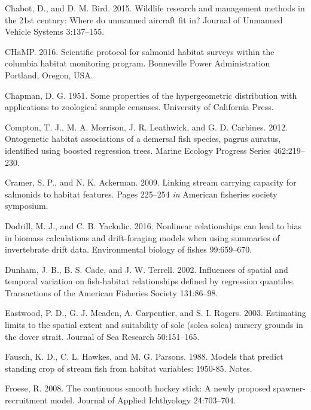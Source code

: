 \documentclass[
  12pt,
]{article}
\begin{document}
\leavevmode\hypertarget{ref-Chabot2015}{}%
Chabot, D., and D. M. Bird. 2015. Wildlife research and management methods in the 21st century: Where do unmanned aircraft fit in? Journal of Unmanned Vehicle Systems 3:137--155.

\leavevmode\hypertarget{ref-CHaMP2016}{}%
CHaMP. 2016. Scientific protocol for salmonid habitat surveys within the columbia habitat monitoring program. Bonneville Power Administration Portland, Oregon, USA.

\leavevmode\hypertarget{ref-Chapman1951}{}%
Chapman, D. G. 1951. Some properties of the hypergeometric distribution with applications to zoological sample censuses. University of California Press.

\leavevmode\hypertarget{ref-Compton2012}{}%
Compton, T. J., M. A. Morrison, J. R. Leathwick, and G. D. Carbines. 2012. Ontogenetic habitat associations of a demersal fish species, pagrus auratus, identified using boosted regression trees. Marine Ecology Progress Series 462:219--230.

\leavevmode\hypertarget{ref-Cramer2009}{}%
Cramer, S. P., and N. K. Ackerman. 2009. Linking stream carrying capacity for salmonids to habitat features. Pages 225--254 \emph{in} American fisheries society symposium.

\leavevmode\hypertarget{ref-Dodrill2016}{}%
Dodrill, M. J., and C. B. Yackulic. 2016. Nonlinear relationships can lead to bias in biomass calculations and drift-foraging models when using summaries of invertebrate drift data. Environmental biology of fishes 99:659--670.

\leavevmode\hypertarget{ref-Dunham2002}{}%
Dunham, J. B., B. S. Cade, and J. W. Terrell. 2002. Influences of spatial and temporal variation on fish-habitat relationships defined by regression quantiles. Transactions of the American Fisheries Society 131:86--98.

\leavevmode\hypertarget{ref-Eastwood2003}{}%
Eastwood, P. D., G. J. Meaden, A. Carpentier, and S. I. Rogers. 2003. Estimating limits to the spatial extent and suitability of sole (solea solea) nursery grounds in the dover strait. Journal of Sea Research 50:151--165.

\leavevmode\hypertarget{ref-Fausch1988}{}%
Fausch, K. D., C. L. Hawkes, and M. G. Parsons. 1988. Models that predict standing crop of stream fish from habitat variables: 1950-85. Notes.

\leavevmode\hypertarget{ref-Froese2008}{}%
Froese, R. 2008. The continuous smooth hockey stick: A newly proposed spawner-recruitment model. Journal of Applied Ichthyology 24:703--704.
\end{document}
